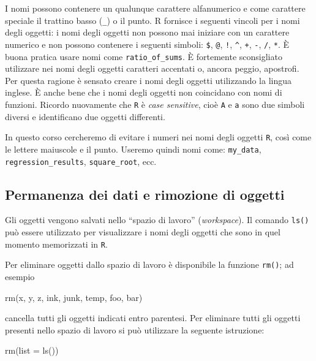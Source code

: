 \documentclass[
  11pt,
]{krantz}
\makeatletter
\newenvironment{Shaded}{\begin{snugshade}}{\end{snugshade}}
\newcommand{\AttributeTok}[1]{\textcolor[rgb]{0.61,0.61,0.61}{#1}}
\newcommand{\FunctionTok}[1]{\textcolor[rgb]{0,0,0}{#1}}
\newcommand{\NormalTok}[1]{#1}
\newenvironment{kframe}{%
\medskip{}
\setlength{\fboxsep}{.8em}
 \def\at@end@of@kframe{}%
 \ifinner\ifhmode%
  \def\at@end@of@kframe{\end{minipage}}%
  \begin{minipage}{\columnwidth}%
 \fi\fi%
 \def\FrameCommand##1{\hskip\@totalleftmargin \hskip-\fboxsep
 \colorbox{shadecolor}{##1}\hskip-\fboxsep
     \hskip-\linewidth \hskip-\@totalleftmargin \hskip\columnwidth}%
 \MakeFramed {\advance\hsize-\width
   \@totalleftmargin\z@ \linewidth\hsize
   \@setminipage}}%
 {\par\unskip\endMakeFramed%
 \at@end@of@kframe}
\renewenvironment{Shaded}{\begin{kframe}}{\end{kframe}}
\theoremstyle{definition}
\theoremstyle{definition}
\theoremstyle{definition}
\theoremstyle{definition}
\theoremstyle{remark}
\makeatother
\begin{document}
I nomi possono contenere un qualunque carattere alfanumerico e come carattere speciale il trattino basso (\texttt{\_}) o il punto. R fornisce i seguenti vincoli per i nomi degli oggetti: i nomi degli oggetti non possono mai iniziare con un carattere numerico e non possono contenere i seguenti simboli: \texttt{\$}, \texttt{@}, \texttt{!}, \texttt{\^{}}, \texttt{+}, \texttt{-}, \texttt{/}, \texttt{*}. È buona pratica usare nomi come \texttt{ratio\_of\_sums}. È fortemente sconsigliato utilizzare nei nomi degli oggetti caratteri accentati o, ancora peggio, apostrofi. Per questa ragione è sensato creare i nomi degli oggetti utilizzando la lingua inglese. È anche bene che i nomi degli oggetti non coincidano con nomi di funzioni. Ricordo nuovamente che \texttt{R} è \emph{case sensitive}, cioè \texttt{A} e \texttt{a} sono due simboli diversi e identificano due oggetti differenti.

In questo corso cercheremo di evitare i numeri nei nomi degli oggetti \texttt{R}, così come le lettere maiuscole e il punto. Useremo quindi nomi come: \texttt{my\_data}, \texttt{regression\_results}, \texttt{square\_root}, ecc.

\hypertarget{permanenza-dei-dati-e-rimozione-di-oggetti}{%
\subsection{Permanenza dei dati e rimozione di oggetti}\label{permanenza-dei-dati-e-rimozione-di-oggetti}}

Gli oggetti vengono salvati nello ``spazio di lavoro'' (\emph{workspace}). Il comando \texttt{ls()} può essere utilizzato per visualizzare i nomi degli oggetti che sono in quel momento memorizzati in \texttt{R}.

Per eliminare oggetti dallo spazio di lavoro è disponibile la funzione \texttt{rm()}; ad esempio

\begin{Shaded}
\begin{Highlighting}[]
\FunctionTok{rm}\NormalTok{(x, y, z, ink, junk, temp, foo, bar)}
\end{Highlighting}
\end{Shaded}

cancella tutti gli oggetti indicati entro parentesi. Per eliminare tutti gli oggetti presenti nello spazio di lavoro si può utilizzare la seguente istruzione:

\begin{Shaded}
\begin{Highlighting}[]
\FunctionTok{rm}\NormalTok{(}\AttributeTok{list =} \FunctionTok{ls}\NormalTok{())}
\end{Highlighting}
\end{Shaded}
\end{document}
